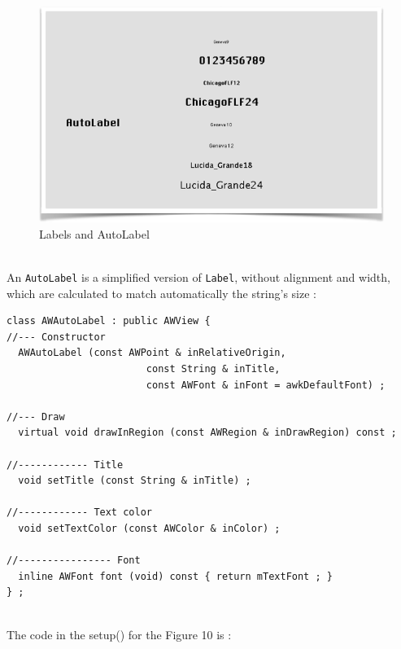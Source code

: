 \documentclass[a4paper,11pt]{extarticle}
\begin{document}
\begin{figure}[htbp]
   \centering
   \includegraphics[scale=0.7]{AWFig9.png} 
   \caption{Labels and AutoLabel}
   \label{fig: 9}
\end{figure}


~\\ An \texttt{AutoLabel} is a simplified version of \texttt{Label}, without alignment and width, which are calculated to match automatically the string's size :

\begin{lstlisting}[language=Arduinonl]
class AWAutoLabel : public AWView {
//--- Constructor
  AWAutoLabel (const AWPoint & inRelativeOrigin,
                        const String & inTitle,
                        const AWFont & inFont = awkDefaultFont) ;

//--- Draw
  virtual void drawInRegion (const AWRegion & inDrawRegion) const ;

//------------ Title
  void setTitle (const String & inTitle) ;

//------------ Text color
  void setTextColor (const AWColor & inColor) ;

//---------------- Font
  inline AWFont font (void) const { return mTextFont ; }
} ;
\end{lstlisting}

~\\ The code in the setup() for the Figure 10 is :
\end{document}

